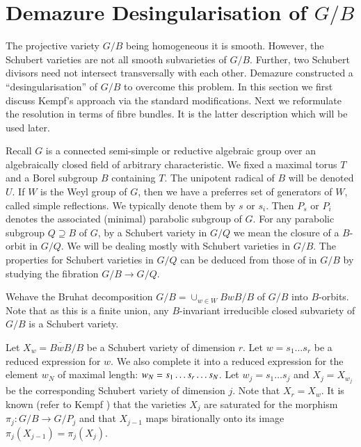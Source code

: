 \section{Demazure Desingularisation of $G/B$}\label{chap1-sec1.2}

The projective variety $G/B$ being homogeneous it is smooth. However,
the Schubert varieties are not all smooth subvarieties of
$G/B$. Further, two Schubert divisors 
need not intersect transversally
with each other. Demazure constructed a ``desingularisation'' of $G/B$
to overcome this problem. In this section we first discuss Kempf's
approach via the standard modifications. Next we reformulate the
resolution in terms of fibre bundles. It is the latter description
which will be used later.

Recall $G$ is a connected semi-simple or reductive algebraic group
over an algebraically closed field of arbitrary characteristic. We
fixed a maximal torus $T$ and a Borel subgroup $B$ containing $T$. The
unipotent radical of $B$ will be denoted $U$. If $W$ is the Weyl group
of $G$, then we have a preferres set of generators of $W$, called
simple reflections. We typically denote them by $s$ or $s_{i}$. Then
$P_{s}$ or $P_{i}$ denotes the associated (minimal) parabolic subgroup
of $G$. For any parabolic subgroup $Q\supseteq B$ of $G$, by a
Schubert variety in $G/Q$ 
we mean the closure of a $B$-orbit in
$G/Q$. We will be dealing mostly with Schubert varieties in $G/B$. The
properties for Schubert varieties in $G/Q$ can be deduced from those
of in $G/B$ by studying the fibration $G/B\to G/Q$.

We\pageoriginale have the Bruhat decomposition $G/B=\cup_{w\in
  W}BwB/B$ of $G/B$ into $B$-orbits. Note that as this is a finite
union, any $B$-invariant irreducible closed subvariety of $G/B$ is a
Schubert variety.

\label{page6}
Let $X_{w}=\overline{BwB}/B$ be a Schubert variety of dimension
$r$. Let $w=s_{1}\ldots s_{r}$ be a reduced expression for $w$. We
also complete it into a reduced expression for the element $w_{N}$ of
maximal length: $w_{N}=s_{1}\ldots s_{r}\break \ldots s_{N}$. Let
$w_{j}=s_{1}\ldots s_{j}$ and $X_{j}=X_{w_{j}}$ be the corresponding
Schubert variety of dimension $j$. Note that $X_{r}=X_{w}$. It is
known (refer to Kempf \cite{key13})
 that the varieties $X_{j}$ are 
saturated for the morphism $\pi_{j}:G/B\to G/P_{j}$ and that $X_{j-1}$
maps birationally 
onto its image $\pi_{j}(X_{j-1})=\pi_{j}(X_{j})$.


